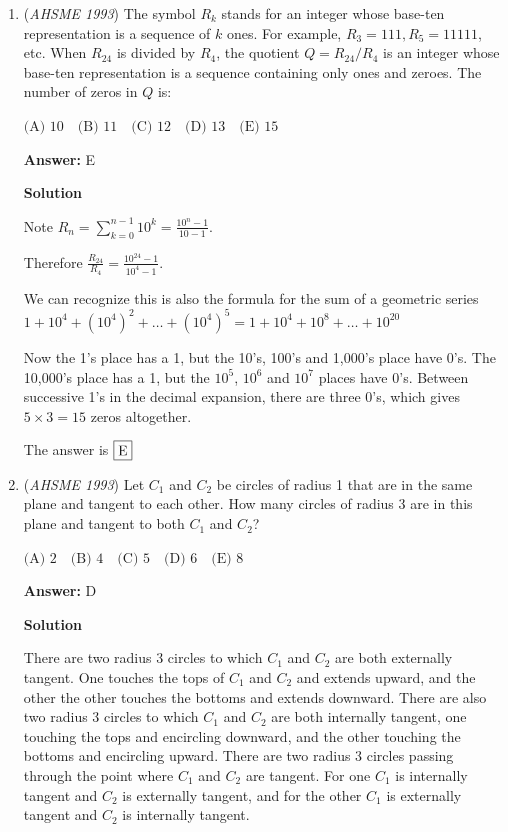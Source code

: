 \begin{enumerate}
\textbf{Solution 2}

$8^{10}+4^{10} = 1074790400$
$8^4 + 4^{11} = 4198400$
$\frac{1074790400}{4198400} = 256$
$\sqrt{256} = 16 = \boxed{B}$



	\item (\textit{AHSME 1993}) The symbol $R_k$ stands for an integer whose base-ten representation is a sequence of $k$ ones. For example, $R_3=111,R_5=11111$, etc. When $R_{24}$ is divided by $R_4$, the quotient $Q=R_{24}/R_4$ is an integer whose base-ten representation is a sequence containing only ones and zeroes. The number of zeros in $Q$ is:


 $\text{(A) } 10\quad \text{(B) } 11\quad \text{(C) } 12\quad \text{(D) } 13\quad \text{(E) } 15$

 \textbf{Answer: }E



\textbf{Solution}

Note $R_n = \sum_{k=0}^{n-1} 10^k = \frac{10^n - 1}{10-1}$.  

 Therefore $\frac{R_{24}}{R_4} = \frac{ 10^{24}-1 }{10^4-1}$.  

 We can recognize this is also the formula for the sum of a geometric series $1+10^4 + (10^4)^2 + \dots + (10^4)^5 = 1+ 10^4 + 10^8 + \dots + 10^{20}$

 Now the 1's place has a 1, but the 10's, 100's and 1,000's place have 0's.  The 10,000's place has a 1, but the $10^5$, $10^6$ and $10^7$ places have 0's.  Between successive 1's in the decimal expansion, there are three 0's, which gives $5\times 3=15$ zeros altogether.

 The answer is $\fbox{E}$



	\item (\textit{AHSME 1993}) Let $C_1$ and $C_2$ be circles of radius 1 that are in the same plane and tangent to each other. How many circles of radius 3 are in this plane and tangent to both $C_1$ and $C_2$?


 $\text{(A) } 2\quad \text{(B) } 4\quad \text{(C) } 5\quad \text{(D) } 6\quad \text{(E) } 8$

 \textbf{Answer: }D



\textbf{Solution}

There are two radius 3 circles to which $C_1$ and $C_2$ are both externally tangent.  One touches the tops of $C_1$ and $C_2$ and extends upward, and the other the other touches the bottoms and extends downward.  There are also two radius 3 circles to which $C_1$ and $C_2$ are both internally tangent, one touching the tops and encircling downward, and the other touching the bottoms and encircling upward.  There are two radius 3 circles passing through the point where $C_1$ and $C_2$ are tangent.  For one $C_1$ is internally tangent and $C_2$ is externally tangent, and for the other $C_1$ is externally tangent and $C_2$ is internally tangent.


\end{enumerate}
